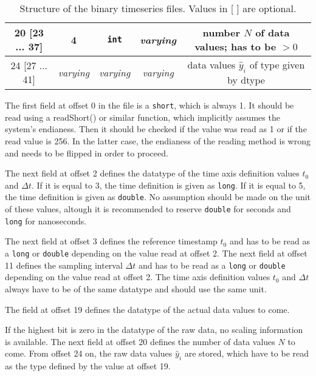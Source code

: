 \documentclass[a4paper,10pt]{article}
\begin{document}
\begin{table}[htbp]
\begin{tabular}{|c|c|c|c|c|}
    20 [23 ... 37] & 4                & \texttt{int}                     & \textit{varying}       & number $N$ of data values; has to be $>0$ \\
    \hline                                                                                        
    24 [27 ... 41] & \textit{varying} & \textit{varying}                 &\textit{varying}        & data values $\hat{y}_i$ of type given by dtype \\
    \hline
 \end{tabular}
 \caption{Structure of the binary timeseries files. Values in [ ] are optional.}
 \label{tab:structure}
\end{table}

The first field at offset 0 in the file is a \texttt{short}, which is always 1.
It should be read using a readShort() or similar function, which implicitly assumes the system's endianess.
Then it should be checked if the value was read as 1 or if the read value is 256. In the latter case,
the endianess of the reading method is wrong and needs to be flipped in order to proceed.

The next field at offset 2 defines the datatype of the time axis definition values $t_0$ and $\Delta t$.
If it is equal to 3, the time definition is given as \texttt{long}.
If it is equal to 5, the time definition is given as \texttt{double}.
No assumption should be made on the unit of these values, altough it is recommended to reserve \texttt{double} for seconds and
\texttt{long} for nanoseconds.

The next field at offset 3 defines the reference timestamp $t_0$ and has to be read as a \texttt{long} or \texttt{double}
depending on the value read at offset 2.
The next field at offset 11 defines the sampling interval $\Delta t$ and has to be read as a \texttt{long} or \texttt{double}
depending on the value read at offset 2.
The time axis definition values $t_0$ and $\Delta t$ always have to be of the same datatype and should use the same unit.

The field at offset 19 defines the datatype of the actual data values to come.

If the highest bit is zero in the datatype of the raw data, no scaling information is available.
The next field at offset 20 defines the number of data values $N$ to come.
From offset 24 on, the raw data values $\hat{y}_i$ are stored, which have to be read as the type defined by the value at offset 19.
\end{document}
